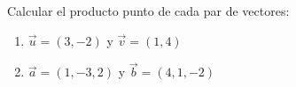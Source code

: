 Calcular el producto punto de cada par de vectores:
\begin{enumerate}
    \item $\vec{u} = (3, -2)$ y $\vec{v} = (1, 4)$
    \item $\vec{a} = (1, -3, 2)$ y $\vec{b} = (4, 1, -2)$
\end{enumerate}